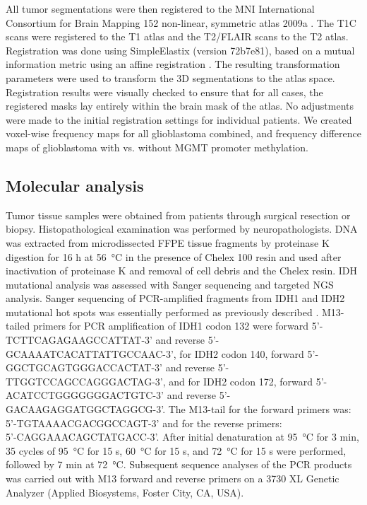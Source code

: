 All tumor segmentations were then registered to the \gls{MNI} International Consortium for Brain Mapping 152 non-linear, symmetric atlas 2009a \autocite{fonov2011unbiased, fonov2009unbiased}.
The \gls{T1C} scans were registered to the \gls{T1} atlas and the \gls{T2}/\gls{FLAIR} scans to the \gls{T2} atlas.
Registration was done using SimpleElastix (version 72b7e81), based on a mutual information metric using an affine registration \autocite{marstal2016simpleelastix}.
The resulting transformation parameters were used to transform the 3D segmentations to the atlas space.
Registration results were visually checked to ensure that for all cases, the registered masks lay entirely within the brain mask of the atlas.
No adjustments were made to the initial registration settings for individual patients.
We created voxel-wise frequency maps for all glioblastoma combined, and frequency difference maps of glioblastoma with vs. without \gls{MGMT} promoter methylation.

\subsection{Molecular analysis}

Tumor tissue samples were obtained from patients through surgical resection or biopsy.
Histopathological examination was performed by neuropathologists.
DNA was extracted from microdissected FFPE tissue fragments by proteinase K digestion for 16 h at \SI{56}{\celsius} in the presence of  Chelex 100 resin and used after inactivation of proteinase K and removal of cell debris and the Chelex resin.
\gls{IDH} mutational analysis was assessed with Sanger sequencing and targeted \gls{NGS} analysis.
Sanger sequencing of PCR-amplified fragments from \gls{IDH}1 and \gls{IDH}2 mutational hot spots was essentially performed as previously described \autocite{vandenbent2013interlaboratory}.
M13-tailed primers for PCR amplification of IDH1 codon 132 were forward {5'-TCTTCAGAGAAGCCATTAT-3'} and reverse {5'-GCAAAATCACATTATTGCCAAC-3'}, for IDH2 codon 140, forward {5'-GGCTGCAGTGGGACCACTAT-3'} and reverse {5'-TTGGTCCAGCCAGGGACTAG-3'}, and for IDH2 codon 172, forward {5'-ACATCCTGGGGGGGACTGTC-3'} and reverse {5'-GACAAGAGGATGGCTAGGCG-3'}.
The M13-tail for the forward primers was: {5'-TGTAAAACGACGGCCAGT-3'} and for the reverse primers: \\{5'-CAGGAAACAGCTATGACC-3'}.
After initial denaturation at \SI{95}{\celsius} for 3 min, 35 cycles of \SI{95}{\celsius} for 15 s, \SI{60}{\celsius} for 15 s, and \SI{72}{\celsius} for 15 s were performed, followed by 7 min at \SI{72}{\celsius}.
Subsequent sequence analyses of the PCR products was carried out with M13 forward and reverse primers on a 3730 XL Genetic Analyzer (Applied Biosystems, Foster City, CA, USA).

